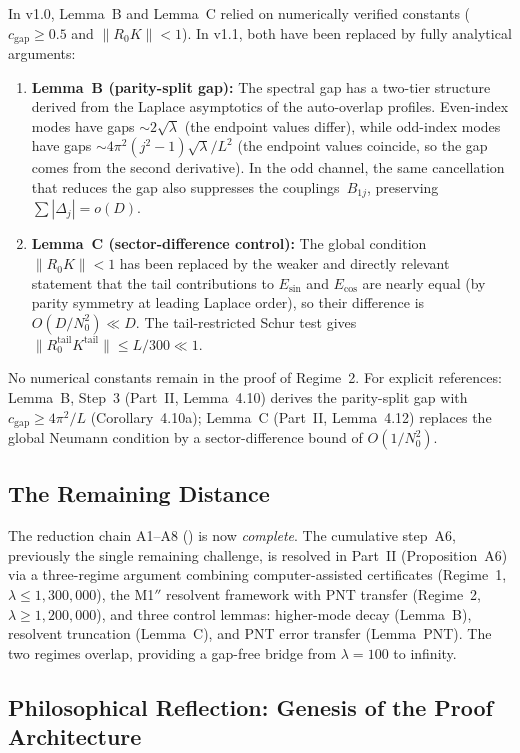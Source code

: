 \documentclass[12pt,a4paper]{article}
\theoremstyle{definition}
\theoremstyle{remark}
\begin{document}
In v1.0, Lemma~B and Lemma~C relied on numerically verified constants ($c_{\mathrm{gap}} \geq 0.5$ and $\|R_0 K\| < 1$). In v1.1, both have been replaced by fully analytical arguments:
\begin{enumerate}
  \item \textbf{Lemma~B (parity-split gap):} The spectral gap has a two-tier structure derived from the Laplace asymptotics of the auto-overlap profiles. Even-index modes have gaps $\sim 2\sqrt{\lambda}$ (the endpoint values differ), while odd-index modes have gaps $\sim 4\pi^2(j^2-1)\sqrt{\lambda}/L^2$ (the endpoint values coincide, so the gap comes from the second derivative). In the odd channel, the same cancellation that reduces the gap also suppresses the couplings~$B_{1j}$, preserving $\sum |\Delta_j| = o(D)$.
  \item \textbf{Lemma~C (sector-difference control):} The global condition $\|R_0 K\| < 1$ has been replaced by the weaker and directly relevant statement that the tail contributions to $E_{\sin}$ and $E_{\cos}$ are nearly equal (by parity symmetry at leading Laplace order), so their difference is $O(D/N_0^2) \ll D$. The tail-restricted Schur test gives $\|R_0^{\mathrm{tail}} K^{\mathrm{tail}}\| \leq L/300 \ll 1$.
\end{enumerate}
No numerical constants remain in the proof of Regime~2. For explicit references: Lemma~B, Step~3 (Part~II, Lemma~4.10) derives the parity-split gap with $c_{\mathrm{gap}} \geq 4\pi^2/L$ (Corollary~4.10a); Lemma~C (Part~II, Lemma~4.12) replaces the global Neumann condition by a sector-difference bound of $O(1/N_0^2)$.

\subsection{The Remaining Distance}

The reduction chain A1--A8 () is now \emph{complete}. The cumulative step~A6, previously the single remaining challenge, is resolved in Part~II (Proposition~A6) via a three-regime argument combining computer-assisted certificates (Regime~1, $\lambda \leq 1{,}300{,}000$), the M1$''$ resolvent framework with PNT transfer (Regime~2, $\lambda \geq 1{,}200{,}000$), and three control lemmas: higher-mode decay (Lemma~B), resolvent truncation (Lemma~C), and PNT error transfer (Lemma~PNT). The two regimes overlap, providing a gap-free bridge from $\lambda = 100$ to infinity.

\subsection{Philosophical Reflection: Genesis of the Proof Architecture}
\end{document}

